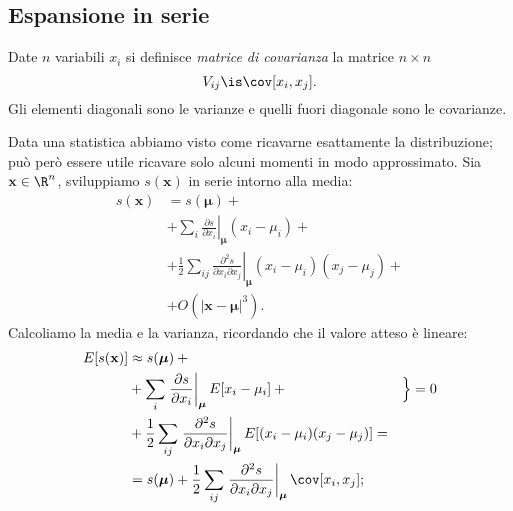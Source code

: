 
\subsection{Espansione in serie}

\begin{definition}
	Date $n$ variabili $x_i$ si definisce \emph{matrice di covarianza} la matrice $n\times n$
	\begin{equation*}
		V_{ij} \is \cov[x_i,x_j].
	\end{equation*}
	Gli elementi diagonali sono le varianze e quelli fuori diagonale sono le covarianze.
\end{definition}

Data una statistica abbiamo visto come ricavarne esattamente la distribuzione;
può però essere utile ricavare solo alcuni momenti in modo approssimato.
Sia $\mathbf x\in\R^n$, sviluppiamo $s(\mathbf x)$ in serie intorno alla media:
\begin{align*}
	s(\mathbf x) &= s(\boldsymbol \mu) + {}\\
	&+ \sum_i \left.\frac{\partial s}{\partial x_i}\right|_{\boldsymbol\mu} (x_i - \mu_i) + {}\\
	&+ \frac12 \sum_{ij} \left.\frac{\partial^2 s}{\partial x_i \partial x_j}\right|_{\boldsymbol\mu} (x_i-\mu_i)(x_j-\mu_j) + {}\\
	&+ O(|\mathbf x - \boldsymbol\mu|^3).
\end{align*}
Calcoliamo la media e la varianza, ricordando che il valore atteso è lineare:
\begin{align*}
	E[s(\mathbf x)] &\approx s(\boldsymbol \mu) + {}\\
	&+ \sum_i \left.\frac{\partial s}{\partial x_i}\right|_{\boldsymbol\mu} E[x_i - \mu_i] + {} & \Big\} = 0\\
	&+ \frac12 \sum_{ij} \left.\frac{\partial^2 s}{\partial x_i \partial x_j}\right|_{\boldsymbol\mu} E[(x_i-\mu_i)(x_j-\mu_j)] = \\
	&= s(\boldsymbol \mu) +
	\frac12 \sum_{ij} \left.\frac{\partial^2 s}{\partial x_i \partial x_j}\right|_{\boldsymbol\mu}
	\cov[x_i,x_j];
\end{align*}
